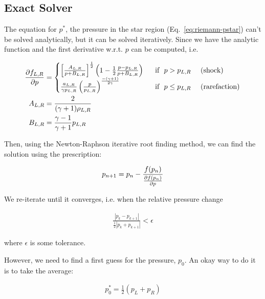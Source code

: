 \subsection{Exact Solver}\label{chap:riemann-exact}


The equation for $p^*$, the pressure in the star region
(Eq.~\ref{eq:riemann-pstar}) can't be solved analytically, but it can be solved
iteratively. Since we have the analytic function and the first derivative
w.r.t. $p$ can be computed, i.e.

\begin{align*}
\frac{\partial f_{L,R}}{\partial p} &=
	\begin{cases}
		\left[
			\frac{A_{L,R}}{p + B_{L,R}}
		\right]^{\frac{1}{2}}
		\left(
			1 - \frac{1}{2} \frac{p - p_{L,R}}{p + B_{L,R}}
		\right)
	& ~\text{ if } ~ p > p_{L,R} ~ \quad \text{(shock)} \\
		\frac{a_{L,R}}{\gamma p_{L,R}}
		\left(
			\frac{p}{p_{L,R}}
		\right)^ \frac{-(\gamma+1)}{2 \gamma}
	& ~\text{ if } ~ p \leq p_{L,R} ~ \quad \text{(rarefaction)}
\label{eq:riemann-pstar-dp}\\
		\end{cases} \\
A_{L,R} &=
	\frac{2}{(\gamma + 1) \rho_{L,R}}\\
B_{L,R} &=
	\frac{\gamma - 1}{\gamma + 1} p_{L,R}
\end{align*}


Then, using the Newton-Raphson iterative root finding method, we can find the
solution using the prescription:

\begin{align}
	p_{n+1} = p_n - \frac{f(p_n)}{\frac{\partial f(p_n)}{\partial p}}
\end{align}


We re-iterate until it converges, i.e. when the relative pressure change

\begin{align}
	\frac{|p_k - p_{k+1}|}{\frac{1}{2} | p_k + p_{k+1} | } < \epsilon
\end{align}

where $\epsilon$ is some tolerance.


However, we need to find a first guess for the pressure, $p_0$.
An okay way to do it is to take the average:

\begin{align*}
	p_0^* = \frac{1}{2} (p_L + p_R)
\end{align*}

